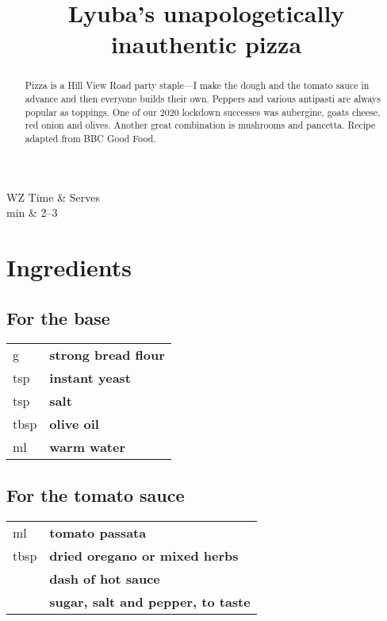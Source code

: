 \documentclass[main.tex]{subfiles}
\title{Lyuba's unapologetically inauthentic pizza}
\begin{document}
\maketitle

\begin{margintable}
\begin{tabularx}{\textwidth}{WZ}
Time  & Serves\\ 
 min & 2--3
\end{tabularx}
\end{margintable}

\begin{abstract}
Pizza is a Hill View Road party staple---I make the dough and the tomato sauce in advance and then everyone builds their own. Peppers and various antipasti are always popular as toppings. One of our 2020 lockdown successes was aubergine, goats cheese, red onion and olives. Another great combination is mushrooms and pancetta.
\linebreak
Recipe adapted from BBC Good Food.
\end{abstract}

\section{Ingredients}

\subsection{For the base}
\vspace*{-\baselineskip}
\begin{table}[ht]
	\begin{tabularx}{\textwidth}{>{\hsize=0.333\hsize}X>{\bf\hsize=1\hsize}X}
	\unit[300]{g} & strong bread flour\\
	\unit[1]{tsp} & instant yeast\\
	\unit[1]{tsp} & salt\\
	\unit[1]{tbsp} & olive oil\\
	\unit[200]{ml} & warm water\\
	\end{tabularx}
\end{table}

\subsection{For the tomato sauce}
\vspace*{-\baselineskip}
\begin{table}[ht]
	\begin{tabularx}{\textwidth}{>{\hsize=0.333\hsize}X>{\bf\hsize=1\hsize}X}
	\unit[100]{ml} & tomato passata\\
	\unit[1]{tbsp} & dried oregano or mixed herbs\\
	\unit[]{} & dash of hot sauce\\
	\unit[]{} & sugar, salt and pepper, to taste\\
	\end{tabularx}
\end{table}
\end{document}
